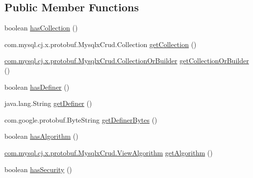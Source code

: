 \subsection*{Public Member Functions}
\begin{DoxyCompactItemize}
\item 
boolean \mbox{\hyperlink{interfacecom_1_1mysql_1_1cj_1_1x_1_1protobuf_1_1_mysqlx_crud_1_1_modify_view_or_builder_ae05b82ed37a651f464384f902cb7350a}{has\+Collection}} ()
\item 
com.\+mysql.\+cj.\+x.\+protobuf.\+Mysqlx\+Crud.\+Collection \mbox{\hyperlink{interfacecom_1_1mysql_1_1cj_1_1x_1_1protobuf_1_1_mysqlx_crud_1_1_modify_view_or_builder_aaea83c3f666e290fc41345199ca3ed17}{get\+Collection}} ()
\item 
\mbox{\hyperlink{interfacecom_1_1mysql_1_1cj_1_1x_1_1protobuf_1_1_mysqlx_crud_1_1_collection_or_builder}{com.\+mysql.\+cj.\+x.\+protobuf.\+Mysqlx\+Crud.\+Collection\+Or\+Builder}} \mbox{\hyperlink{interfacecom_1_1mysql_1_1cj_1_1x_1_1protobuf_1_1_mysqlx_crud_1_1_modify_view_or_builder_a8c6439df1616350ae1f54b81ea44f3fe}{get\+Collection\+Or\+Builder}} ()
\item 
boolean \mbox{\hyperlink{interfacecom_1_1mysql_1_1cj_1_1x_1_1protobuf_1_1_mysqlx_crud_1_1_modify_view_or_builder_a580f9ee3ee1e6c5c9f56417e5ab36af2}{has\+Definer}} ()
\item 
java.\+lang.\+String \mbox{\hyperlink{interfacecom_1_1mysql_1_1cj_1_1x_1_1protobuf_1_1_mysqlx_crud_1_1_modify_view_or_builder_a85a7c21e473fd43eadf150fd5962e48d}{get\+Definer}} ()
\item 
com.\+google.\+protobuf.\+Byte\+String \mbox{\hyperlink{interfacecom_1_1mysql_1_1cj_1_1x_1_1protobuf_1_1_mysqlx_crud_1_1_modify_view_or_builder_a093f515af62c867d0195e84580a56e69}{get\+Definer\+Bytes}} ()
\item 
boolean \mbox{\hyperlink{interfacecom_1_1mysql_1_1cj_1_1x_1_1protobuf_1_1_mysqlx_crud_1_1_modify_view_or_builder_a7201d2cc7dbd6ff126413ce94b734d3e}{has\+Algorithm}} ()
\item 
\mbox{\hyperlink{enumcom_1_1mysql_1_1cj_1_1x_1_1protobuf_1_1_mysqlx_crud_1_1_view_algorithm}{com.\+mysql.\+cj.\+x.\+protobuf.\+Mysqlx\+Crud.\+View\+Algorithm}} \mbox{\hyperlink{interfacecom_1_1mysql_1_1cj_1_1x_1_1protobuf_1_1_mysqlx_crud_1_1_modify_view_or_builder_a5763d580676b453c47209fe24d0fcbbd}{get\+Algorithm}} ()
\item 
boolean \mbox{\hyperlink{interfacecom_1_1mysql_1_1cj_1_1x_1_1protobuf_1_1_mysqlx_crud_1_1_modify_view_or_builder_a3e9475f020fd4b7fc3c19a05319dd4a3}{has\+Security}} ()

\end{DoxyCompactItemize}
